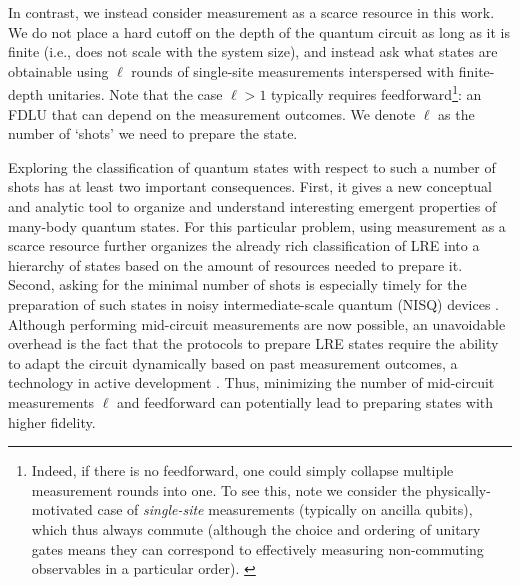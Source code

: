 \documentclass[nofootinbib,prx,twocolumn,showpacs,superscriptaddress,notitlepage,amsmath,amssymb]{revtex4-2}
\theoremstyle{definition}
\begin{document}
In contrast, we instead consider measurement as a scarce resource in this work. We do not place a hard cutoff on the depth of the quantum circuit as long as it is finite (i.e., does not scale with the system size), and instead ask what states are obtainable using $\ell$ rounds of single-site measurements interspersed with finite-depth unitaries. Note that the case $\ell>1$ typically requires feedforward\footnote{Indeed, if there is no feedforward, one could simply collapse multiple measurement rounds into one. To see this, note we consider the physically-motivated case of \emph{single-site} measurements (typically on ancilla qubits), which thus always commute (although the choice and ordering of unitary gates means they can correspond to effectively measuring non-commuting observables in a particular order). \label{footnote:singlemeasurement}}: an FDLU that can depend on the measurement outcomes. We denote $\ell$ as the number of `shots' we need to prepare the state.

Exploring the classification of quantum states with respect to such a number of shots has at least two important consequences. First, it gives a new conceptual and analytic tool to organize and understand interesting emergent properties of many-body quantum states.  For this particular problem, using measurement as a scarce resource further organizes the already rich classification of LRE into a hierarchy of states based on the amount of resources needed to prepare it.  Second, asking for the minimal number of shots is especially timely for the preparation of such states in noisy intermediate-scale quantum (NISQ) devices \cite{NISQ}. Although performing mid-circuit measurements are now possible, an unavoidable overhead is the fact that the protocols to prepare LRE states require the ability to adapt the circuit dynamically based on past measurement outcomes, a technology in active development \cite{DynamicCircuitIBM21,MidCircuitHoneywell21,MidCircuitIBM22,MidCircuitSandia22}. Thus, minimizing the number of mid-circuit measurements $\ell$ and feedforward can potentially lead to preparing states with higher fidelity.
\end{document}
